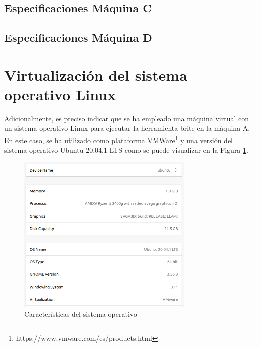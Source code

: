 \subsection{Especificaciones Máquina C}

\subsection{Especificaciones Máquina D}





\section{Virtualización del sistema operativo Linux}
Adicionalmente, es preciso indicar que se ha empleado una máquina virtual con un sistema operativo Linux para ejecutar la herramienta \gls{brite} en la máquina A. En este caso, se ha utilizado como plataforma VMWare\footnote{https://www.vmware.com/es/products.html} y una versión del sistema operativo Ubuntu 20.04.1 LTS como se puede visualizar en la Figura \ref{fig:ubuntu}.

\begin{figure}[h!]
    \centering
    \includegraphics[width=0.75\textwidth]{img/anexos/ubuntu.PNG}
    \caption{Características del sistema operativo}
    \label{fig:ubuntu}
\end{figure}